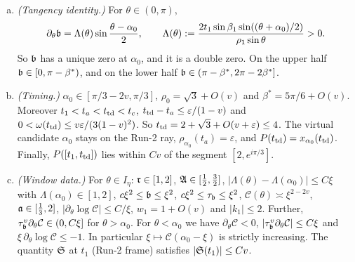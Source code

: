 \begin{lemma}\label{lem:B-window}
\begin{enumerate}[(a)]\setlength{\itemsep}{1pt}
\item \emph{(Tangency identity.)} For $\theta\in(0,\pi)$,
\[
\partial_\theta\mathfrak{b}=\Lambda(\theta)\sin\frac{\theta-\alpha_0}2,\qquad
\Lambda(\theta):=\frac{2t_1\sin\beta_1\sin((\theta+\alpha_0)/2)}{\rho_1\sin\theta}>0 .
\]
So $\mathfrak{b}$ has a unique zero at $\alpha_0$, and it is a double zero. On the upper half $\mathfrak{b}\in[0,\pi-\beta^*)$, and on the lower half $\mathfrak{b}\in(\pi-\beta^*,2\pi-2\beta^*]$.
\item \emph{(Timing.)} $\alpha_0\in[\pi/3-2v,\pi/3]$, $\rho_0=\sqrt3+O(v)$ and $\beta^*=5\pi/6+O(v)$. Moreover
$t_1<t_a<t_{\mathrm{td}}<t_c$, $t_{\mathrm{td}}-t_a\le\varepsilon/(1-v)$ and $0<\omega(t_{\mathrm{td}})\le v\varepsilon/(3(1-v)^2)$. So
$t_{\mathrm{td}}=2+\sqrt3+O(v+\varepsilon)\le4$. The virtual candidate $\alpha_0$ stays on the Run-2 ray, $\rho_{\alpha_0}(t_a)=\varepsilon$, and
$P(t_{\mathrm{td}})=x_{\alpha_0}(t_{\mathrm{td}})$. Finally, $P([t_1,t_{\mathrm{td}}])$ lies within $Cv$ of the segment $[2,e^{i\pi/3}]$.
\item \emph{(Window data.)} For $\theta\in I_\eta$:
$\mathfrak{r}\in[1,2]$, $\mathfrak{A}\in[\frac12,\frac32]$, $|\Lambda(\theta)-\Lambda(\alpha_0)|\le C\xi$ with $\Lambda(\alpha_0)\in[1,2]$,
$c\xi^2\le\mathfrak{b}\le\xi^2$, $c\xi^2\le\tau_{\mathfrak{b}}\le\xi^2$, $\mathcal C(\theta)\asymp\xi^{2-2v}$, $\mathfrak{a}\in[\frac13,2]$,
$|\partial_\theta\log\mathcal C|\le C/\xi$, $w_1=1+O(v)$ and $|k_1|\le2$. Further,
$\tau_{\mathfrak{b}}^v\partial_\theta\mathcal C\in(0,C\xi]$ for $\theta>\alpha_0$. For $\theta<\alpha_0$ we have $\partial_\theta\mathcal C<0$,
$|\tau_{\mathfrak{b}}^v\partial_\theta\mathcal C|\le C\xi$ and $\xi\,\partial_\theta\log\mathcal C\le-1$. In particular $\xi\mapsto \mathcal C(\alpha_0-\xi)$ is
strictly increasing. The quantity $\mathfrak{S}$ at $t_1$ (Run-2 frame) satisfies $|\mathfrak{S}(t_1)|\le Cv$.
\end{enumerate}
\end{lemma}
